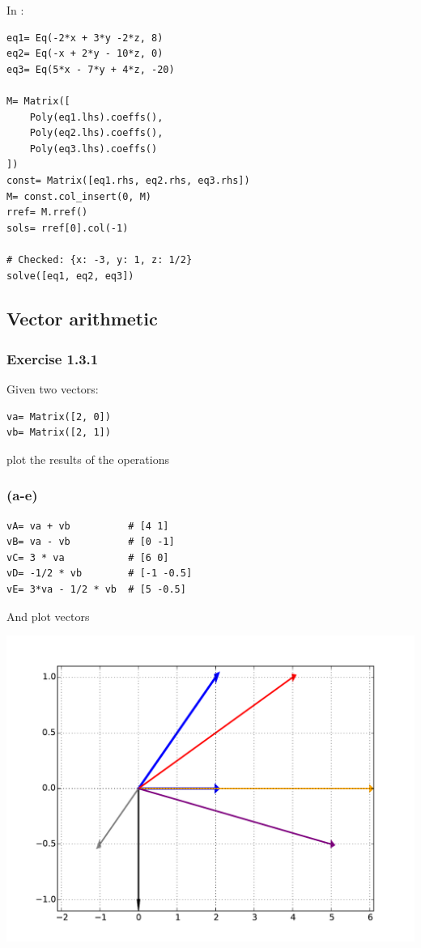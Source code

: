 In \sympy:

\begin{verbatim}
eq1= Eq(-2*x + 3*y -2*z, 8)
eq2= Eq(-x + 2*y - 10*z, 0)
eq3= Eq(5*x - 7*y + 4*z, -20)

M= Matrix([
    Poly(eq1.lhs).coeffs(),
    Poly(eq2.lhs).coeffs(),
    Poly(eq3.lhs).coeffs()
])
const= Matrix([eq1.rhs, eq2.rhs, eq3.rhs])
M= const.col_insert(0, M)
rref= M.rref()
sols= rref[0].col(-1)

# Checked: {x: -3, y: 1, z: 1/2}
solve([eq1, eq2, eq3])
\end{verbatim}

\subsection{Vector arithmetic}

\subsubsection{Exercise 1.3.1}

Given two vectors:

\begin{verbatim}
va= Matrix([2, 0])
vb= Matrix([2, 1])
\end{verbatim}

plot the results of the operations 

\subsubsection{(a-e)}

\begin{verbatim}
vA= va + vb          # [4 1]
vB= va - vb          # [0 -1]
vC= 3 * va           # [6 0]
vD= -1/2 * vb        # [-1 -0.5]
vE= 3*va - 1/2 * vb  # [5 -0.5]
\end{verbatim}

And plot vectors

\includegraphics[width=\linewidth]{figs/ex1_3.pdf}

